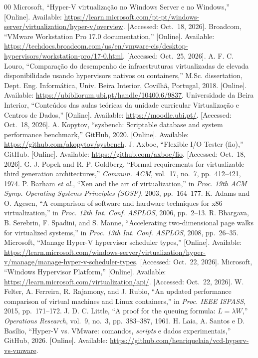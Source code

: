 \documentclass[conference]{IEEEtran}
\begin{document}
\begin{thebibliography}{00}
 Microsoft, ``Hyper-V virtualização no Windows Server e no Windows,'' [Online]. Available: \url{https://learn.microsoft.com/pt-pt/windows-server/virtualization/hyper-v/overview}. [Accessed: Oct.~18, 2026].
 Broadcom, ``VMware Workstation Pro 17.0 documentation,'' [Online]. Available: \url{https://techdocs.broadcom.com/us/en/vmware-cis/desktop-hypervisors/workstation-pro/17-0.html}. [Accessed: Oct.~25, 2026].
 A. F. C. Louro, ``Comparação do desempenho de infraestruturas virtualizadas de elevada disponibilidade usando hypervisors nativos ou containers,'' M.Sc. dissertation, Dept. Eng. Informática, Univ. Beira Interior, Covilhã, Portugal, 2018. [Online]. Available: \url{https://ubibliorum.ubi.pt/handle/10400.6/9837}.
 Universidade da Beira Interior, ``Conteúdos das aulas teóricas da unidade curricular Virtualização e Centros de Dados,'' [Online]. Available: \url{https://moodle.ubi.pt/}. [Accessed: Oct.~18, 2026].
 A. Kopytov, ``sysbench: Scriptable database and system performance benchmark,'' GitHub, 2020. [Online]. Available: \url{https://github.com/akopytov/sysbench}.
 J. Axboe, ``Flexible I/O Tester (fio),'' GitHub. [Online]. Available: \url{https://github.com/axboe/fio}. [Accessed: Oct.~18, 2026].
 G. J. Popek and R. P. Goldberg, ``Formal requirements for virtualizable third generation architectures,'' \textit{Commun. ACM}, vol.~17, no.~7, pp.~412--421, 1974.
 P. Barham \textit{et al.}, ``Xen and the art of virtualization,'' in \textit{Proc. 19th ACM Symp. Operating Systems Principles (SOSP)}, 2003, pp.~164--177.
 K. Adams and O. Agesen, ``A comparison of software and hardware techniques for x86 virtualization,'' in \textit{Proc. 12th Int. Conf. ASPLOS}, 2006, pp.~2--13.
 R. Bhargava, B. Serebrin, F. Spadini, and S. Manne, ``Accelerating two-dimensional page walks for virtualized systems,'' in \textit{Proc. 13th Int. Conf. ASPLOS}, 2008, pp.~26--35.
 Microsoft, ``Manage Hyper-V hypervisor scheduler types,'' [Online]. Available: \url{https://learn.microsoft.com/windows-server/virtualization/hyper-v/manage/manage-hyper-v-scheduler-types}. [Accessed: Oct.~22, 2026].
 Microsoft, ``Windows Hypervisor Platform,'' [Online]. Available: \url{https://learn.microsoft.com/virtualization/api/}. [Accessed: Oct.~22, 2026].
 W. Felter, A. Ferreira, R. Rajamony, and J. Rubio, ``An updated performance comparison of virtual machines and Linux containers,'' in \textit{Proc. IEEE ISPASS}, 2015, pp.~171--172.
 J. D. C. Little, ``A proof for the queuing formula: $L=\lambda W$,'' \textit{Operations Research}, vol.~9, no.~3, pp.~383--387, 1961.
 H. Laia, A. Santos e D. Basílio, ``Hyper-V vs. VMware: comandos, \textit{scripts} e dados experimentais,'' GitHub, 2026. [Online]. Available: \url{https://github.com/henriquelaia/vcd-hyperv-vs-vmware}.
\end{thebibliography}
\end{document}
